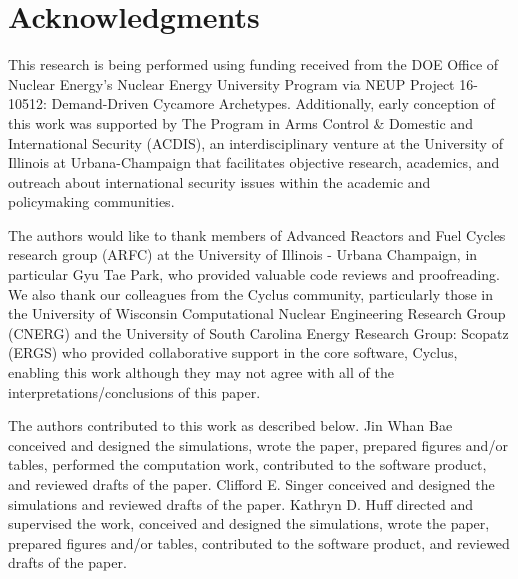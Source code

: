\section{Acknowledgments}
This research is being performed using funding received from the DOE Office of
Nuclear Energy's Nuclear Energy University Program via NEUP Project 16-10512:
Demand-Driven Cycamore Archetypes. Additionally, early conception of this work was supported by 
The Program in Arms Control \& Domestic and International Security (ACDIS), an
interdisciplinary venture at the University of Illinois at Urbana-Champaign
that facilitates objective research, academics, and outreach about
international security issues within the academic and policymaking communities.

The authors would like to thank  members of Advanced Reactors and Fuel Cycles
research group (ARFC) at the University of Illinois - Urbana Champaign, in
particular Gyu Tae Park, who provided valuable code reviews and proofreading.
We also thank our colleagues from the Cyclus community, particularly those in
the University of Wisconsin Computational Nuclear Engineering Research Group
(CNERG) and the University of South Carolina Energy Research Group: Scopatz
(ERGS) who provided collaborative support in the core software, Cyclus,
enabling this work although they may not agree with all of the
interpretations/conclusions of this paper.  

The authors contributed to this work as described below.  Jin Whan Bae
conceived and designed the simulations, wrote the paper, prepared figures
and/or tables, performed the computation work, contributed to the software
product, and reviewed drafts of the paper.  Clifford E. Singer conceived and
designed the simulations and reviewed drafts of the paper.  Kathryn
D. Huff directed and supervised the work, conceived and designed the
simulations, wrote the paper, prepared figures and/or tables, contributed to
the software product, and reviewed drafts of the paper.  

